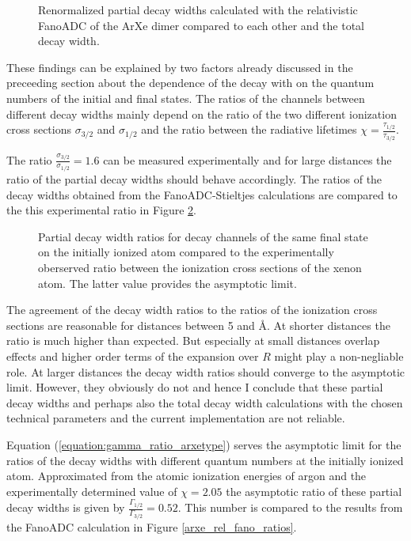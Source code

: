 \begin{figure}[]
  \centering
  
  \caption{Renormalized partial decay widths calculated with the relativistic
           FanoADC of the ArXe dimer compared to each other and the total decay
           width.}
  \label{figure:arxe_rel_fano_partial}
\end{figure}

These findings can be explained by two factors already discussed in the preceeding
section about the dependence of the decay with on the quantum numbers of the
initial and final states. The ratios of the channels between different decay widths
mainly depend on the ratio of the two different ionization cross sections
$\sigma_{3/2}$ and $\sigma_{1/2}$ and the ratio between the radiative lifetimes
$\chi = \frac{\tau_{1/2}}{\tau_{3/2}}$.

The ratio $\frac{\sigma_{3/2}}{\sigma_{1/2}}=1.6$ can be measured experimentally
\cite{} and for large distances the ratio of the partial decay widths should
behave accordingly. The ratios of the decay widths obtained from the
FanoADC-Stieltjes calculations are compared to the this experimental ratio in
Figure \ref{figure:arxe_rel_fano_ratios_sigma}.
\begin{figure}[]
  \centering
  
  \caption{Partial decay width ratios for decay channels of the same final
           state on the initially ionized atom compared to the experimentally
           oberserved ratio between the ionization cross sections of the xenon
           atom. The latter value provides the asymptotic limit.}
  \label{figure:arxe_rel_fano_ratios_sigma}
\end{figure}

The agreement of the decay width ratios to the ratios of the ionization cross
sections are reasonable for distances between 5 and \unit[10]{\AA}. At shorter
distances the ratio is much higher than expected. But especially at small distances
overlap effects and higher order terms of the expansion over $R$ might play
a non-negliable role. At larger distances the decay width ratios should converge
to the asymptotic limit. However, they obviously do not and hence I conclude
that these partial decay widths and perhaps also the total decay width calculations
with the chosen technical parameters and the current implementation are not
reliable.

Equation (\ref{equation:gamma_ratio_arxetype}) serves the asymptotic limit
for the ratios of the decay widths with different quantum numbers at the initially
ionized atom. Approximated from the atomic ionization energies of argon and the
experimentally determined value of $\chi = 2.05$ \cite{}
the asymptotic ratio of these partial decay widths is given by
$\frac{\Gamma_{1/2}}{\Gamma_{3/2}} = 0.52$. This number is compared to
the results from the FanoADC calculation in Figure \ref{arxe_rel_fano_ratios}.

